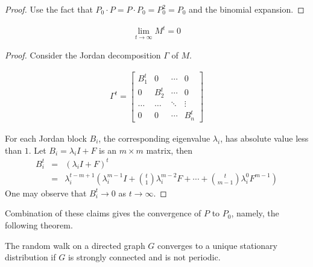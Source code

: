 \begin{proof}
Use the fact that $P_0\cdot P=P\cdot P_0=P_0^2=P_0$ and the binomial
expansion.
\end{proof}

\begin{claim}
\begin{eqnarray*}
\lim_{t\to\infty}M^t=0
\end{eqnarray*}
\end{claim}

\begin{proof}
Consider the Jordan decomposition $\Gamma$ of $M$.

\begin{eqnarray*}
\Gamma^t=\left[
\begin{array}{cccc}
B_1^t & 0 & \cdots & 0\\
0 & B_2^t & \cdots & 0\\
\ldots & \ldots & \ddots & \vdots\\
0 & 0 & \cdots & B_n^t
\end{array}
\right]
\end{eqnarray*}

For each Jordan block $B_i$, the corresponding eigenvalue
$\lambda_i$, has absolute value less than $1$. Let $B_i=\lambda_i
I+F$ is an $m\times m$ matrix, then
\begin{eqnarray*}
B_i^t&=&(\lambda_i I+F)^t\\
&=&\lambda_i^{t-m+1}\left(\lambda_i^{m-1}I+{t\choose
1}\lambda_i^{m-2}F+\cdots+{t\choose m-1}\lambda_i^0F^{m-1}\right)
\end{eqnarray*}
One may observe that $B_i^t\to 0$ as $t\to\infty$.
\end{proof}

Combination of these claims gives the convergence of $P$ to $P_0$,
namely, the following theorem.
\begin{theorem}
The random walk on a directed graph $G$ converges to a unique
stationary distribution if $G$ is strongly connected and is not
periodic.
\end{theorem}
